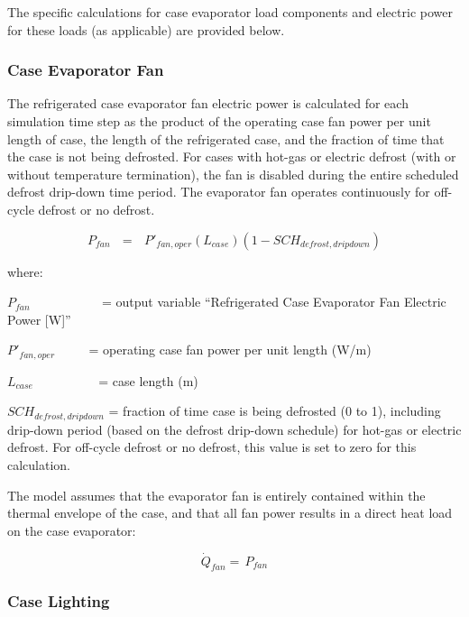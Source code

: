 The specific calculations for case evaporator load components and electric power for these loads (as applicable) are provided below.

\subsubsection{Case Evaporator Fan}\label{case-evaporator-fan}

The refrigerated case evaporator fan electric power is calculated for each simulation time step as the product of the operating case fan power per unit length of case, the length of the refrigerated case, and the fraction of time that the case is not being defrosted. For cases with hot-gas or electric defrost (with or without temperature termination), the fan is disabled during the entire scheduled defrost drip-down time period. The evaporator fan operates continuously for off-cycle defrost or no defrost.

\begin{equation}
{P_{fan}}\,\,\,\, = \,\,\,\,{P'}_{fan,oper}\left( {{L_{case}}} \right)\left( {1 - SC{H_{defrost,dripdown}}} \right)
\end{equation}

where:

\({P_{fan}}\) ~~~~~~~~~~ = output variable ``Refrigerated Case Evaporator Fan Electric Power {[}W{]}''

\({P'}_{fan,oper}\) ~~~~ = operating case fan power per unit length (W/m)

\({L_{case}}\) ~~~~~~~~~ = case length (m)

\(SC{H_{defrost,dripdown}}\) = fraction of time case is being defrosted (0 to 1), including drip-down period (based on the defrost drip-down schedule) for hot-gas or electric defrost. For off-cycle defrost or no defrost, this value is set to zero for this calculation.

The model assumes that the evaporator fan is entirely contained within the thermal envelope of the case, and that all fan power results in a direct heat load on the case evaporator:

\begin{equation}
{\dot Q_{fan}} = \,{P_{fan}}
\end{equation}

\subsubsection{Case Lighting}\label{case-lighting}

